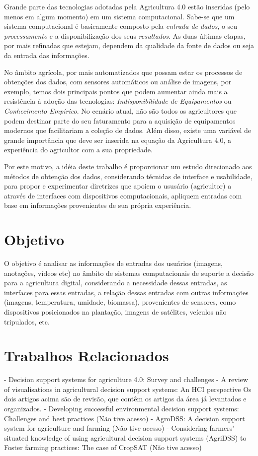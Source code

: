 \documentclass[12pt]{article}
\begin{document}
Grande parte das tecnologias adotadas pela Agricultura 4.0 estão inseridas (pelo menos em algum momento) em um sistema computacional. Sabe-se que um sistema computacional é basicamente composto pela \textit{entrada de dados}, o seu \textit{processamento} e a disponibilização dos seus \textit{resultados}. As duas últimas etapas, por mais refinadas que estejam, dependem da qualidade da fonte de dados ou seja da entrada das informações.

No âmbito agrícola, por mais automatizados que possam estar os processos de obtenções dos dados, com sensores automáticos ou análise de imagens, por exemplo, temos dois principais pontos que podem aumentar ainda mais a resistência à adoção das tecnologias: \textit{Indisponibilidade de Equipamentos} ou \textit{Conhecimento Empírico}. No cenário atual, não são todos os agricultores que podem destinar parte do seu faturamento para a aquisição de equipamentos modernos que facilitariam a coleção de dados. Além disso, existe uma variável de grande importância que deve ser inserida na equação da Agricultura 4.0, a experiência do agricultor com a sua propriedade.

Por este motivo, a idéia deste trabalho é proporcionar um estudo direcionado aos métodos de obtenção dos dados, considerando técnidas de interface e usabilidade, para propor e experimentar diretrizes que apoiem o ususário (agricultor) a através de interfaces com dispositivos computacionais, apliquem entradas com base em informações provenientes de sua própria experiência.

\section{Objetivo}

O objetivo é analisar as informações de entradas dos usuários (imagens, anotações, vídeos etc) no âmbito de sistemas computacionais de suporte a decisão para a agricultura digital, considerando a necessidade dessas entradas, as interfaces para essas entradas, a relação dessas entradas com outras informações (imagens, temperatura, umidade, biomassa), provenientes de sensores, como dispositivos posicionados na plantação, imagens de satélites, veículos não tripulados, etc.

\section{Trabalhos Relacionados}

- Decision support systems for agriculture 4.0: Survey and challenges
- A review of visualisations in agricultural decision support systems: An HCI perspective
Os dois artigos acima são de revisão, que contêm os artigos da área já levantados e organizados.
- Developing successful environmental decision support systems: Challenges and best practices (Não tive acesso)
- AgroDSS: A decision support system for agriculture and farming (Não tive acesso)
- Considering farmers' situated knowledge of using agricultural decision support systems (AgriDSS) to Foster farming practices: The case of CropSAT (Não tive acesso)
\end{document}
